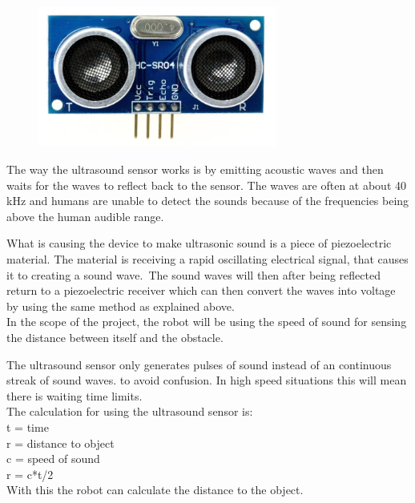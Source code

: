 \begin{figure}[!ht]
	\centering
	\includegraphics[width=0.7\textwidth]{figures/hc04.jpg}
	\caption{}
	\label{HC-SR04}
\end{figure}


The way the ultrasound sensor works is by emitting acoustic waves and then waits for the waves to reflect back to the sensor. The waves are often at about 40 kHz and humans are unable to detect the sounds because of the frequencies being above the human audible range.\

What is causing the device to make ultrasonic sound is a piece of piezoelectric material. The material is receiving a rapid oscillating electrical signal, that causes  it to creating a sound wave.\ The sound waves will then after being reflected return to a piezoelectric receiver which can then convert the waves into voltage by using the same method as explained above. \\

In the scope of the project, the robot will be using the speed of sound for sensing the distance between itself and the obstacle.\

The ultrasound sensor only generates pulses of sound instead of an continuous streak of sound waves. to avoid confusion. In high speed situations this will mean there is waiting time limits.\\ 

The calculation for using the ultrasound sensor is:\\

t = time\\
r = distance to object\\
c = speed of sound\\

r = c*t/2\\

With this the robot can calculate the distance to the object.\

